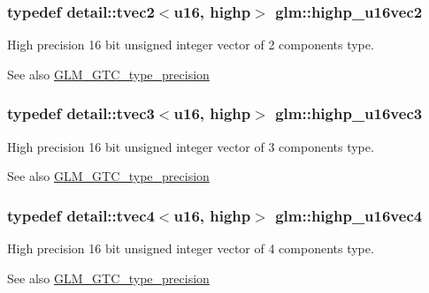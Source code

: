 \subsubsection[{\texorpdfstring{highp\+\_\+u16vec2}{highp_u16vec2}}]{\setlength{\rightskip}{0pt plus 5cm}typedef detail\+::tvec2$<$u16, highp$>$ {\bf glm\+::highp\+\_\+u16vec2}}\hypertarget{group__gtc__type__precision_gafad4245d389a4990eb505cd74a2d0a6f}{}\label{group__gtc__type__precision_gafad4245d389a4990eb505cd74a2d0a6f}
High precision 16 bit unsigned integer vector of 2 components type. \begin{DoxySeeAlso}{See also}
\hyperlink{group__gtc__type__precision}{G\+L\+M\+\_\+\+G\+T\+C\+\_\+type\+\_\+precision} 
\end{DoxySeeAlso}
\subsubsection[{\texorpdfstring{highp\+\_\+u16vec3}{highp_u16vec3}}]{\setlength{\rightskip}{0pt plus 5cm}typedef detail\+::tvec3$<$u16, highp$>$ {\bf glm\+::highp\+\_\+u16vec3}}\hypertarget{group__gtc__type__precision_gad98b30ad9bbfb79233340be3ba53ceb6}{}\label{group__gtc__type__precision_gad98b30ad9bbfb79233340be3ba53ceb6}
High precision 16 bit unsigned integer vector of 3 components type. \begin{DoxySeeAlso}{See also}
\hyperlink{group__gtc__type__precision}{G\+L\+M\+\_\+\+G\+T\+C\+\_\+type\+\_\+precision} 
\end{DoxySeeAlso}
\subsubsection[{\texorpdfstring{highp\+\_\+u16vec4}{highp_u16vec4}}]{\setlength{\rightskip}{0pt plus 5cm}typedef detail\+::tvec4$<$u16, highp$>$ {\bf glm\+::highp\+\_\+u16vec4}}\hypertarget{group__gtc__type__precision_ga89074b108ec0643cffdfd008bedd3ffb}{}\label{group__gtc__type__precision_ga89074b108ec0643cffdfd008bedd3ffb}
High precision 16 bit unsigned integer vector of 4 components type. \begin{DoxySeeAlso}{See also}
\hyperlink{group__gtc__type__precision}{G\+L\+M\+\_\+\+G\+T\+C\+\_\+type\+\_\+precision} 
\end{DoxySeeAlso}
